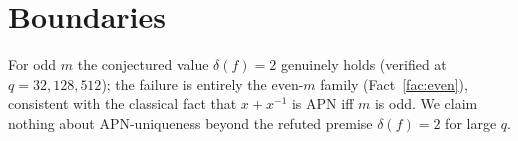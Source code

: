 \documentclass[11pt]{article}
\begin{document}
\section{Boundaries}

For odd $m$ the conjectured value $\delta(f) = 2$ genuinely holds (verified at
$q = 32, 128, 512$); the failure is entirely the even-$m$ family
(Fact~\ref{fac:even}), consistent with the classical fact that $x + x^{-1}$ is
APN iff $m$ is odd. We claim nothing about APN-uniqueness beyond the refuted
premise $\delta(f) = 2$ for large $q$.
\end{document}
